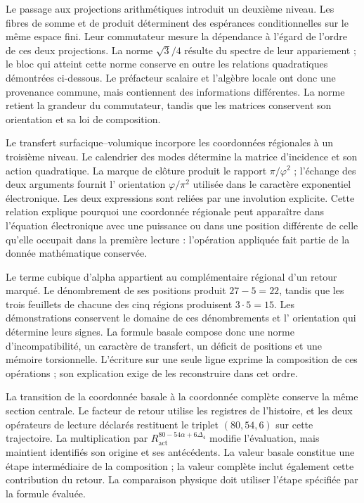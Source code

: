 Le passage aux projections arithmétiques introduit un deuxième niveau. Les
fibres de somme et de produit déterminent des espérances conditionnelles sur le
même espace fini. Leur commutateur mesure la dépendance à l'égard de
l'ordre de ces deux projections. La norme $\sqrt3/4$ résulte du spectre
de leur appariement ; le bloc qui atteint cette norme conserve en outre
les relations quadratiques démontrées ci-dessous. Le
préfacteur scalaire et l'algèbre locale ont donc une provenance commune, mais
contiennent des informations différentes. La norme retient la grandeur du
commutateur, tandis que les matrices conservent son orientation et sa loi de
composition.

Le transfert surfacique--volumique incorpore les coordonnées régionales
à un troisième niveau. Le calendrier des modes détermine la matrice
d'incidence et son action quadratique. La marque de clôture produit le rapport
$\pi/\varphi^2$ ; l'échange des deux arguments fournit l'
orientation $\varphi/\pi^2$ utilisée dans le caractère exponentiel
électronique. Les deux expressions sont reliées par une involution
explicite. Cette relation explique pourquoi une coordonnée régionale peut
apparaître dans l'équation électronique avec une puissance ou dans une position
différente de celle qu'elle occupait dans la première lecture : l'opération appliquée
fait partie de la donnée mathématique conservée.

Le terme cubique d'alpha appartient au complémentaire régional d'un retour
marqué. Le dénombrement de ses positions produit $27-5=22$, tandis que les
trois feuillets de chacune des cinq régions produisent $3\cdot5=15$.
Les démonstrations conservent le domaine de ces dénombrements et l'
orientation qui détermine leurs signes. La formule basale compose
donc une norme d'incompatibilité, un caractère de
transfert, un déficit de positions et une mémoire torsionnelle.
L'écriture sur une seule ligne exprime la composition de ces
opérations ; son explication exige de les reconstruire dans cet ordre.

La transition de la coordonnée basale à la coordonnée complète conserve
la même section centrale. Le facteur de retour utilise les registres
de l'histoire, et les deux opérateurs de lecture déclarés restituent le triplet
$(80,54,6)$ sur cette trajectoire. La multiplication par
$R_{\mathrm{act}}^{80-54\alpha+6\Delta_4}$ modifie l'évaluation,
mais maintient identifiés son origine et ses antécédents. La valeur
basale constitue une étape intermédiaire de la composition ; la valeur
complète inclut également cette contribution du retour. La comparaison
physique doit utiliser l'étape spécifiée par la formule évaluée.

